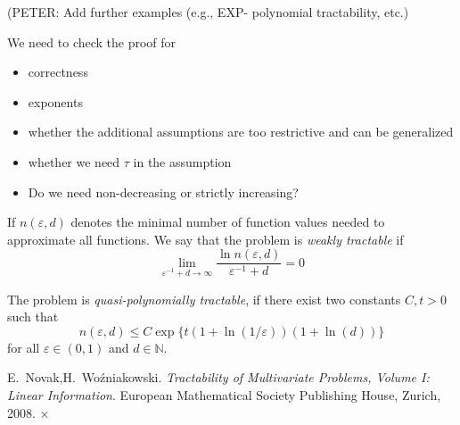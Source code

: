 \documentclass[11pt,a4paper]{article}
\newcommand{\fred}[1]{\begingroup\color{blue}#1\endgroup}
\newcommand{\peter}[1]{\begingroup\color{purple}#1\endgroup}
\begin{document}
\peter{(PETER: Add further examples (e.g., EXP- polynomial tractability, etc.)}

\bigskip

\fred{We need to check the proof for
\begin{itemize}
\item correctness
\item exponents
\item whether the additional assumptions are too restrictive and can be generalized
\item whether we need $\tau$ in the assumption
\item Do we need non-decreasing or strictly increasing?
\end{itemize}}
\begin{definition}
If $n(\varepsilon,d)$ denotes the minimal number of function values needed to approximate all functions. We say that the problem is \emph{weakly tractable} if
    \[\lim_{\varepsilon^{-1}+d\rightarrow \infty} \frac{\ln n(\varepsilon,d)}{\varepsilon^{-1}+d} = 0\]
\end{definition}
\begin{definition}
    The problem is \emph{quasi-polynomially tractable}, if there exist two constants $C, t> 0$ such that
    \[
    n(\varepsilon,d) \leq C\exp\{t(1+\ln(1/\varepsilon))(1+\ln(d))\}
    \] for all $\varepsilon \in (0,1)$ and $d\in\mathbb{N}$.
\end{definition}
\begin{thebibliography}{99}

 E.~Novak,H.~Wo\'zniakowski. \textit{Tractability of Multivariate Problems, Volume I: Linear Information}.
European Mathematical Society Publishing House, Zurich, 2008.
 ×
\end{thebibliography}
\end{document}
